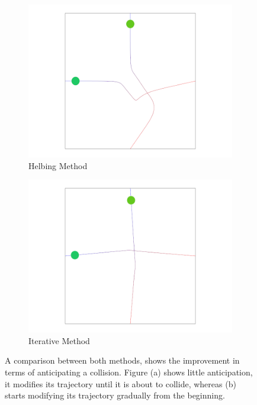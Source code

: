 \begin{figure}[t]
 \centering
%
\begin{subfigure}[b]{0.48\linewidth}
 \centering
	\includegraphics[width=\linewidth]{images/res-helbing-crossing.png}
	\caption{Helbing Method}
 \end{subfigure}
%
\begin{subfigure}[b]{0.48\linewidth}
 \centering
	\includegraphics[width=\linewidth]{images/res-iter-crossing.png}
	\caption{Iterative Method}
 \end{subfigure}
% 
\caption{A comparison between both methods, shows the improvement in terms of anticipating a collision. Figure (a) shows little anticipation, it modifies its trajectory until it is about to collide, whereas (b) starts modifying its trajectory gradually from the beginning.}
\label{fig:res:helbing}
\end{figure}

